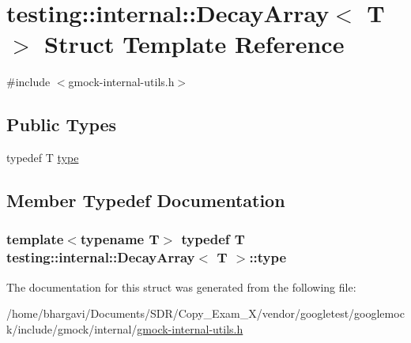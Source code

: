 \hypertarget{structtesting_1_1internal_1_1_decay_array}{}\section{testing\+:\+:internal\+:\+:Decay\+Array$<$ T $>$ Struct Template Reference}
\label{structtesting_1_1internal_1_1_decay_array}


{\ttfamily \#include $<$gmock-\/internal-\/utils.\+h$>$}

\subsection*{Public Types}
\begin{DoxyCompactItemize}
\item 
typedef T \hyperlink{structtesting_1_1internal_1_1_decay_array_a39803f9bafd56bc4531f86eb34fe9c0f}{type}
\end{DoxyCompactItemize}


\subsection{Member Typedef Documentation}
\subsubsection[{\texorpdfstring{type}{type}}]{\setlength{\rightskip}{0pt plus 5cm}template$<$typename T$>$ typedef T {\bf testing\+::internal\+::\+Decay\+Array}$<$ T $>$\+::{\bf type}}\hypertarget{structtesting_1_1internal_1_1_decay_array_a39803f9bafd56bc4531f86eb34fe9c0f}{}\label{structtesting_1_1internal_1_1_decay_array_a39803f9bafd56bc4531f86eb34fe9c0f}


The documentation for this struct was generated from the following file\+:\begin{DoxyCompactItemize}
\item 
/home/bhargavi/\+Documents/\+S\+D\+R/\+Copy\+\_\+\+Exam\+\_\+X/vendor/googletest/googlemock/include/gmock/internal/\hyperlink{gmock-internal-utils_8h}{gmock-\/internal-\/utils.\+h}\end{DoxyCompactItemize}
